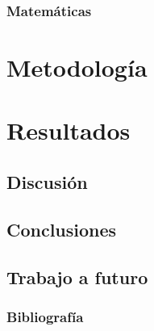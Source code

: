 \documentclass{beamer}
\theoremstyle{definition}
\begin{document}

\subsubsection{Matem\'aticas}


\section{Metodolog\'ia}


\section{Resultados}


\subsection{Discusi\'on}


\subsection{Conclusiones}


\subsection{Trabajo a futuro}


\begin{frame}[allowframebreaks]
\frametitle{Bibliograf\'ia}
\footnotesize{
%
{}
%

}
\end{frame}

\end{document}
